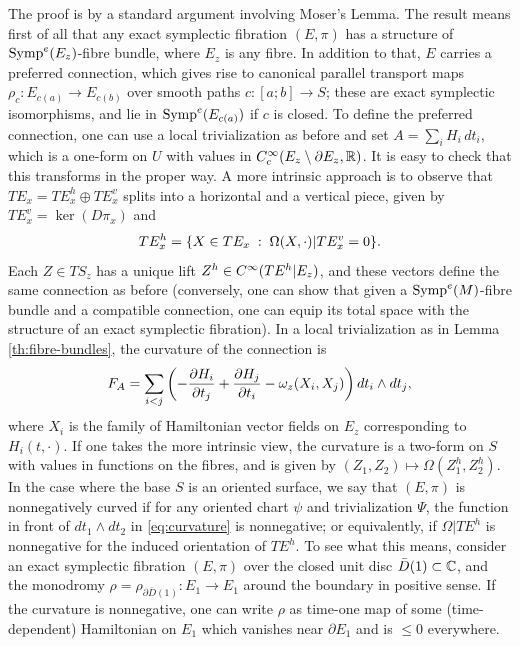 \documentclass[10pt,letterpaper]{article}
\begin{document}
The proof is by a standard argument involving Moser's Lemma. The result means
first of all that any exact symplectic fibration $(E,\pi)$ has a structure of
$\mathrm{Symp}^e(E_z)$-fibre bundle, where $E_z$ is any fibre. In addition to that, $E$
carries a preferred connection, which gives rise to canonical parallel
transport maps $\rho_c: E_{c(a)} \rightarrow E_{c(b)}$ over smooth paths $c:
[a;b] \rightarrow S$; these are exact symplectic isomorphisms, and lie in
$\mathrm{Symp}^e(E_{c(a)})$ if $c$ is closed. To define the preferred connection, one
can use a local trivialization as before and set $A = \sum_i H_i\,dt_i$, which
is a one-form on $U$ with values in $C^\infty_c(E_z \setminus \partial E_z,\mathbb{R})$.
It is easy to check that this transforms in the proper way. A more intrinsic
approach is to observe that $TE_x = TE^h_x \oplus TE^v_x$ splits into a
horizontal and a vertical piece, given by $TE^v_x = \ker(D\pi_x)$ and
\begin{equation} \label{eq:connection}
TE^h_x = \{X \in TE_x \; : \; \Omega(X,\cdot)|TE^v_x = 0\}.
\end{equation}
Each $Z \in TS_z$ has a unique lift $Z^h \in C^\infty(TE^h|E_z)$, and these
vectors define the same connection as before (conversely, one can show that
given a $\mathrm{Symp}^e(M)$-fibre bundle and a compatible connection, one can equip its
total space with the structure of an exact symplectic fibration). In a local
trivialization as in Lemma \ref{th:fibre-bundles}, the curvature of the
connection is
\begin{equation} \label{eq:curvature}
F_A = \sum_{i<j} \left( -\frac{\partial H_i}{\partial t_j} + \frac{\partial
H_j}{\partial t_i} - \omega_z(X_i,X_j) \right) dt_i \wedge dt_j,
\end{equation}
where $X_i$ is the family of Hamiltonian vector fields on $E_z$ corresponding
to $H_i(t,\cdot)$. If one takes the more intrinsic view, the curvature is a
two-form on $S$ with values in functions on the fibres, and is given by
$(Z_1,Z_2) \mapsto \Omega(Z_1^h,Z_2^h)$. In the case where the base $S$ is an
oriented surface, we say that $(E,\pi)$ is nonnegatively curved if for any
oriented chart $\psi$ and trivialization $\Psi$, the function in front of $dt_1
\wedge dt_2$ in \eqref{eq:curvature} is nonnegative; or equivalently, if
$\Omega|TE^h$ is nonnegative for the induced orientation of $TE^h$. To see what
this means, consider an exact symplectic fibration $(E,\pi)$ over the closed
unit disc $\bar{D}(1) \subset \mathbb{C}$, and the monodromy $\rho = \rho_{\partial
\bar{D}(1)} : E_1 \rightarrow E_1$ around the boundary in positive sense. If
the curvature is nonnegative, one can write $\rho$ as time-one map of some
(time-dependent) Hamiltonian on $E_1$ which vanishes near $\partial E_1$ and is
$\leq 0$ everywhere.
\end{document}
